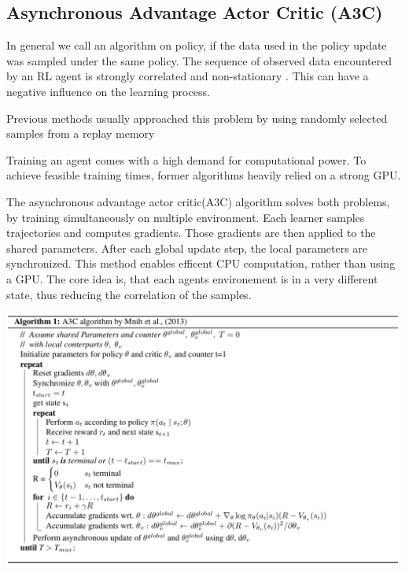 \pagebreak



\subsection{Asynchronous Advantage Actor Critic (A3C)}

In general we call an algorithm on policy, if the data used in the policy update was sampled under the same policy. The sequence of observed data encountered by an RL agent is strongly correlated and non-stationary \citep{A3C}. This can have a negative influence on the learning process.

Previous methods usually approached this problem by using randomly selected samples from a replay memory \citep{mnih2015atari}

Training an agent comes with a high demand for computational power. To achieve feasible training times, former algorithms heavily relied on a strong GPU.

The asynchronous advantage actor critic(A3C) algorithm solves both problems, by training simultaneously on multiple environment.
Each learner samples trajectories and computes gradients. Those gradients are then applied to the shared parameters. 
After each global update step, the local parameters are synchronized.
This method enables efficent CPU computation, rather than using a GPU.
The core idea is, that each agents environement is in a very different state, thus reducing the correlation of the samples.
 
\includegraphics[scale=0.3]{bilder/aaac.png}